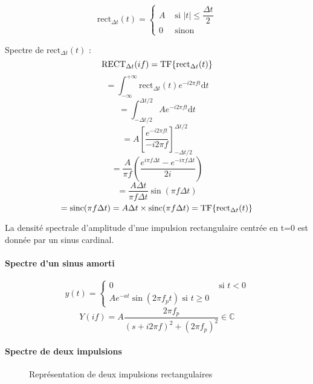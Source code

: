 \documentclass[a4paper,12pt]{article}
\begin{document}
\[ \mathrm{rect}_{\Delta t}(t) =
\begin{cases}
    A & \text{ si } |t| \leq \dfrac{\Delta t}{2} \\
    0 & \text{ sinon}
\end{cases} \]

Spectre de $\mathrm{rect}_{\Delta t}(t)$ :
\[ \mathrm{RECT}_{\Delta t}(if) = \mathrm{TF} \{  \mathrm{rect}_{\Delta t}(t) \} \]
\[ = \int_{-\infty}^{+\infty} \mathrm{rect}_{\Delta t}(t) e^{-i2\pi ft} \mathrm{d}t \]
\[ = \int_{-\Delta t / 2}^{\Delta t / 2} A e^{-i2\pi ft} \mathrm{d}t \]
\[ = A[\dfrac{e^{-i2\pi ft}}{-i2\pi f}]_{-\Delta t / 2}^{\Delta t / 2} \]
\[ = \dfrac{A}{\pi f} (\dfrac{e^{i\pi f\Delta t} - e^{-i\pi f\Delta t}}{2i}) \]
\[ = \dfrac{A\Delta t}{\pi f \Delta t} \sin(\pi f\Delta t) \]
\[ = \mathrm{sinc}(\pi f\Delta t) = A\Delta t \times \mathrm{sinc}(\pi f\Delta t) = \mathrm{TF} \{  \mathrm{rect}_{\Delta t}(t) \} \]

La densité spectrale d'amplitude d'nue impulsion rectangulaire centrée en t=0 est donnée par un sinus cardinal.

\paragraph{Spectre d'un sinus amorti}

\[ y(t) = \begin{cases}
    0 & \text{ si } t < 0 \\
    Ae^{-at} \sin(2\pi f_pt) \text{ si } t \geq 0
\end{cases} \]
\[ Y(if) = A\dfrac{2\pi f_p}{(s + i2\pi f)^2 + (2\pi f_p)^2} \in \mathbb{C} \]

\paragraph{Spectre de deux impulsions}

\begin{figure}[!htbp]
	\centering
	\caption{Représentation de deux impulsions rectangulaires}
\end{figure}
\end{document}

